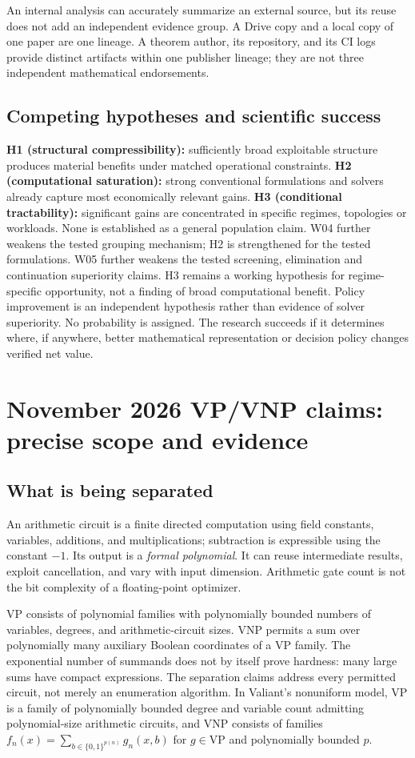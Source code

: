 \documentclass[11pt,letterpaper]{article}
\begin{document}
An internal analysis can accurately summarize an external source, but its reuse does not add an independent evidence group. A Drive copy and a local copy of one paper are one lineage. A theorem author, its repository, and its CI logs provide distinct artifacts within one publisher lineage; they are not three independent mathematical endorsements.

\subsection{Competing hypotheses and scientific success}
\textbf{H1 (structural compressibility):} sufficiently broad exploitable structure produces material benefits under matched operational constraints. \textbf{H2 (computational saturation):} strong conventional formulations and solvers already capture most economically relevant gains. \textbf{H3 (conditional tractability):} significant gains are concentrated in specific regimes, topologies or workloads. None is established as a general population claim. W04 further weakens the tested grouping mechanism; H2 is strengthened for the tested formulations. W05 further weakens the tested screening, elimination and continuation superiority claims. H3 remains a working hypothesis for regime-specific opportunity, not a finding of broad computational benefit. Policy improvement is an independent hypothesis rather than evidence of solver superiority. No probability is assigned. The research succeeds if it determines where, if anywhere, better mathematical representation or decision policy changes verified net value.

\section{November 2026 VP/VNP claims: precise scope and evidence}
\label{sec:vp}
\subsection{What is being separated}
An arithmetic circuit is a finite directed computation using field constants, variables, additions, and multiplications; subtraction is expressible using the constant $-1$. Its output is a \emph{formal polynomial}. It can reuse intermediate results, exploit cancellation, and vary with input dimension. Arithmetic gate count is not the bit complexity of a floating-point optimizer.

VP consists of polynomial families with polynomially bounded numbers of variables, degrees, and arithmetic-circuit sizes. VNP permits a sum over polynomially many auxiliary Boolean coordinates of a VP family. The exponential number of summands does not by itself prove hardness: many large sums have compact expressions. The separation claims address every permitted circuit, not merely an enumeration algorithm. In Valiant's nonuniform model, VP is a family of polynomially bounded degree and variable count admitting polynomial-size arithmetic circuits, and VNP consists of families $f_n(x)=\sum_{b\in\{0,1\}^{p(n)}}g_n(x,b)$ for $g\in\mathrm{VP}$ and polynomially bounded $p$.\cite{valiant}
\end{document}
